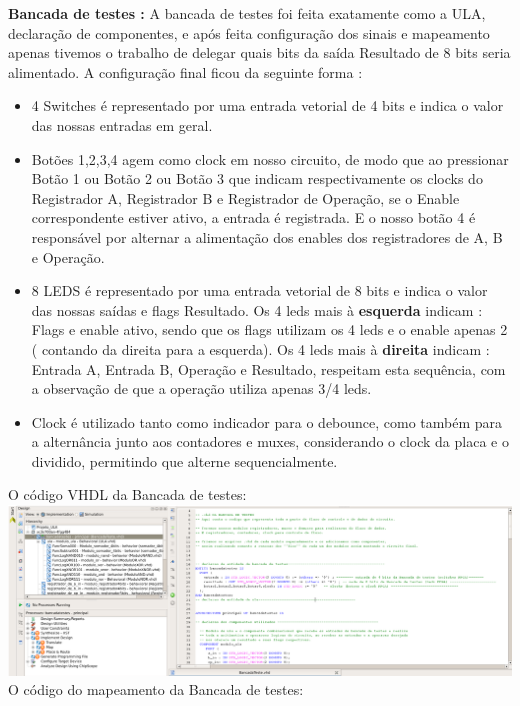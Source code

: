 \documentclass[11pt]{book}
\begin{document}
\textbf{Bancada de testes : }
\newline\newline
A bancada de testes foi feita exatamente como a ULA, declaração de componentes, e após feita configuração dos sinais e mapeamento apenas tivemos o trabalho de delegar quais bits da saída Resultado de 8 bits seria alimentado.
A configuração final ficou da seguinte forma : 
\begin{itemize}
    \item 4 Switches é representado por uma entrada vetorial de 4 bits e indica o valor das  nossas entradas em geral.
    \item Botões 1,2,3,4 agem como clock em nosso circuito, de modo que ao pressionar Botão 1 ou Botão 2 ou Botão 3 que indicam respectivamente os clocks do Registrador A, Registrador B e Registrador de Operação, se o Enable correspondente estiver ativo, a entrada é registrada. E o nosso botão 4 é responsável por alternar a alimentação dos enables dos registradores de A, B e Operação.
    \item 8 LEDS é representado por uma entrada vetorial de 8 bits e indica o valor das nossas saídas e flags Resultado. Os 4 leds mais à \textbf{esquerda} indicam : Flags e enable ativo, sendo que os flags utilizam os 4 leds e o enable apenas 2 ( contando da direita para a esquerda). Os 4 leds mais à \textbf{direita} indicam : Entrada A, Entrada B, Operação e Resultado, respeitam esta sequência, com a observação de que a operação utiliza apenas 3/4 leds.
    \item Clock é utilizado tanto como indicador para o debounce, como também para a alternância junto aos contadores e muxes, considerando o clock da placa e o dividido, permitindo que alterne sequencialmente.  
\end{itemize}
O código VHDL da Bancada de testes:
\newline\newline
\includegraphics[width=1.1\textwidth]{Codigo_Bancada.png}
\newline
\newpage O código do mapeamento da Bancada de testes:
\end{document}
